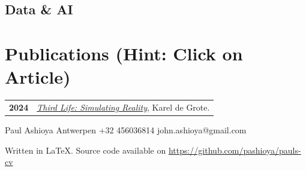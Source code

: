 \documentclass{modernsimplecv}
\newlength{\rightcolwidth}
\begin{document}
\begin{paracol}{2}
\subsection*{Data \& AI}


\begin{skillsection}{\rightcolwidth}
\end{skillsection}

\bigskip



\vspace{4em}


\begin{minipage}[t]{\rightcolwidth}
\section*{Publications (Hint: Click on Article)}
\begin{tabular}{>{\footnotesize\bfseries}r >{\footnotesize}p{}}
2024 & \emph{\href{https://medium.com/@john.ashioya/third-life-simulating-reality-14d7663896dd}{Third Life: Simulating Reality}}, Karel de Grote. \\
\end{tabular}
\bigskip
\end{minipage}
\end{paracol}

\vfill{} %
\setlength{\parindent}{0pt}
\begin{minipage}[t]{\textwidth}
\begin{center}\fontfamily{\sfdefault}\selectfont \color{black!70}
{\small Paul Ashioya  Antwerpen  +32 456036814 
 {john.ashioya@gmail.com}
}
\end{center} 
\begin{center}  \color{gray}
    {
        Written in LaTeX. Source code available on \protect\url{https://github.com/pashioya/pauls-cv}
    }
\end{center}
\end{minipage}
\end{document}
